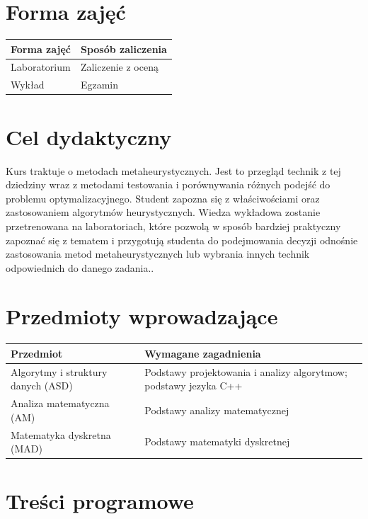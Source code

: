 \documentclass[12pt, a4paper]{article}
\begin{document}
\section{Forma zajęć}

\begin{tabular}{ll}
  \hline
  \textbf{Forma zajęć} & \textbf{Sposób zaliczenia} \\
  \hline
  Laboratorium & Zaliczenie z oceną \\
  Wykład & Egzamin \\
  \hline
\end{tabular}

\section{Cel dydaktyczny}

Kurs traktuje o metodach metaheurystycznych. Jest to przegląd technik z tej dziedziny wraz z metodami testowania i porównywania różnych podejść do problemu optymalizacyjnego. Student zapozna się z właściwościami oraz zastosowaniem algorytmów heurystycznych. Wiedza wykładowa zostanie przetrenowana na laboratoriach, które pozwolą w sposób bardziej praktyczny zapoznać się z tematem i przygotują studenta do podejmowania decyzji odnośnie zastosowania metod metaheurystycznych lub wybrania innych technik odpowiednich do danego zadania..

\section{Przedmioty wprowadzające}

\begin{tabularx}{\textwidth}{lX}
  \hline
  \textbf{Przedmiot} & \textbf{Wymagane zagadnienia} \\
  \hline
  Algorytmy i struktury danych (ASD) & Podstawy projektowania i analizy algorytmow; podstawy jezyka C++ \\
  Analiza matematyczna (AM) & Podstawy analizy matematycznej \\
  Matematyka dyskretna (MAD) & Podstawy matematyki dyskretnej \\
  \hline
\end{tabularx}

\section{Treści programowe}
\end{document}
